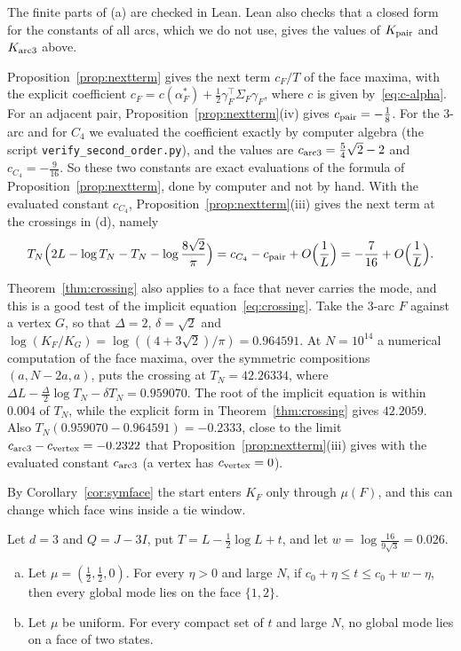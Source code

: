 The finite parts of (a) are checked in Lean. Lean also checks that a closed
form for the constants of all arcs, which we do not use, gives the values of
$K_{\rm pair}$ and $K_{\rm arc3}$ above.

Proposition~\ref{prop:nextterm} gives the next term $c_F/T$ of the face
maxima, with the explicit coefficient
$c_F=c(\alpha^*_F)+\frac12\gamma_F^\top\Sigma_F\gamma_F$, where $c$ is given
by~\eqref{eq:c-alpha}. For an adjacent pair, Proposition~\ref{prop:nextterm}(iv)
gives $c_{\rm pair}=-\frac18$. For the 3-arc and for $C_4$ we evaluated the
coefficient exactly by computer algebra (the script
\texttt{verify\_second\_order.py}), and the values are
$c_{\rm arc3}=\frac54\sqrt2-2$ and $c_{C_4}=-\frac9{16}$. So these two
constants are exact evaluations of the formula of
Proposition~\ref{prop:nextterm}, done by computer and not by hand. With the
evaluated constant $c_{C_4}$, Proposition~\ref{prop:nextterm}(iii) gives the
next term at the crossings in (d), namely
\[
 T_N\Bigl(2L-\log T_N-T_N-\log\frac{8\sqrt2}\pi\Bigr)
 =c_{C_4}-c_{\rm pair}+O\Bigl(\frac1L\Bigr)=-\frac7{16}+O\Bigl(\frac1L\Bigr).
\]

Theorem~\ref{thm:crossing} also applies to a face that never carries the mode,
and this is a good test of the implicit equation~\eqref{eq:crossing}. Take the
3-arc $F$ against a vertex $G$, so that $\Delta=2$, $\delta=\sqrt2$ and
$\log(K_F/K_G)=\log((4+3\sqrt2)/\pi)=0.964591$. At $N=10^{14}$ a numerical
computation of the face maxima, over the symmetric compositions $(a,N-2a,a)$,
puts the crossing at $T_N=42.26334$, where
$\Delta L-\frac\Delta2\log T_N-\delta T_N=0.959070$. The root of the implicit
equation is within $0.004$ of $T_N$, while the explicit form in
Theorem~\ref{thm:crossing} gives $42.2059$. Also
$T_N(0.959070-0.964591)=-0.2333$, close to the limit
$c_{\rm arc3}-c_{\rm vertex}=-0.2322$ that
Proposition~\ref{prop:nextterm}(iii) gives with the evaluated constant
$c_{\rm arc3}$ (a vertex has $c_{\rm vertex}=0$).

By Corollary~\ref{cor:symface} the start enters $K_F$ only through $\mu(F)$, and this can
change which face wins inside a tie window.

\begin{corollary}\label{cor:K3start}
Let $d=3$ and $Q=J-3I$, put $T=L-\frac12\log L+t$, and let
$w=\log\frac{16}{9\sqrt3}=0.026$.
\begin{enumerate}[(a)]
\item Let $\mu=(\frac12,\frac12,0)$. For every $\eta>0$ and large $N$, if
$c_0+\eta\le t\le c_0+w-\eta$, then every global mode lies on the face $\{1,2\}$.
\item Let $\mu$ be uniform. For every compact set of $t$ and large $N$, no global mode lies on a
face of two states.
\end{enumerate}
\end{corollary}

